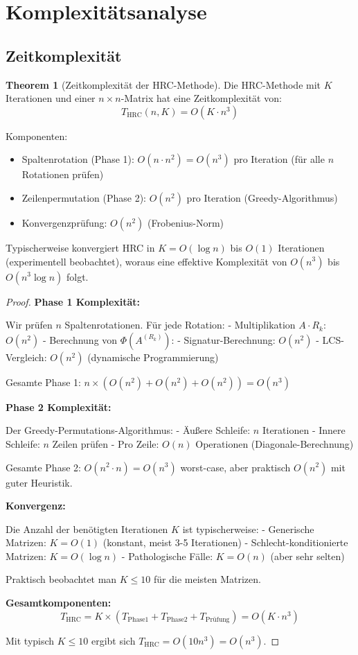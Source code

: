 \documentclass[a4paper,12pt]{article}
\theoremstyle{definition}
\newtheorem{theorem}{Theorem}
\begin{document}
\section{Komplexitätsanalyse}

\subsection{Zeitkomplexität}

\begin{theorem}[Zeitkomplexität der HRC-Methode]
Die HRC-Methode mit $K$ Iterationen und einer $n \times n$-Matrix hat eine Zeitkomplexität von:
\[
T_{\text{HRC}}(n, K) = O(K \cdot n^3)
\]

Komponenten:
\begin{itemize}
	\item Spaltenrotation (Phase 1): $O(n \cdot n^2) = O(n^3)$ pro Iteration (für alle $n$ Rotationen prüfen)
	\item Zeilenpermutation (Phase 2): $O(n^2)$ pro Iteration (Greedy-Algorithmus)
	\item Konvergenzprüfung: $O(n^2)$ (Frobenius-Norm)
\end{itemize}

Typischerweise konvergiert HRC in $K = O(\log n)$ bis $O(1)$ Iterationen (experimentell beobachtet), woraus eine effektive Komplexität von $O(n^3)$ bis $O(n^3 \log n)$ folgt.
\end{theorem}

\begin{proof}
\textbf{Phase 1 Komplexität:} 

Wir prüfen $n$ Spaltenrotationen. Für jede Rotation:
- Multiplikation $A \cdot R_k$: $O(n^2)$
- Berechnung von $\Phi(A^{(R_k)})$: 
  - Signatur-Berechnung: $O(n^2)$
  - LCS-Vergleich: $O(n^2)$ (dynamische Programmierung)

Gesamte Phase 1: $n \times (O(n^2) + O(n^2) + O(n^2)) = O(n^3)$

\textbf{Phase 2 Komplexität:}

Der Greedy-Permutations-Algorithmus:
- Äußere Schleife: $n$ Iterationen
- Innere Schleife: $n$ Zeilen prüfen
- Pro Zeile: $O(n)$ Operationen (Diagonale-Berechnung)

Gesamte Phase 2: $O(n^2 \cdot n) = O(n^3)$ worst-case, aber praktisch $O(n^2)$ mit guter Heuristik.

\textbf{Konvergenz:}

Die Anzahl der benötigten Iterationen $K$ ist typischerweise:
- Generische Matrizen: $K = O(1)$ (konstant, meist 3-5 Iterationen)
- Schlecht-konditionierte Matrizen: $K = O(\log n)$
- Pathologische Fälle: $K = O(n)$ (aber sehr selten)

Praktisch beobachtet man $K \leq 10$ für die meisten Matrizen.

\textbf{Gesamtkomponenten:}
\[
T_{\text{HRC}} = K \times (T_{\text{Phase1}} + T_{\text{Phase2}} + T_{\text{Prüfung}}) = O(K \cdot n^3)
\]

Mit typisch $K \leq 10$ ergibt sich $T_{\text{HRC}} = O(10 n^3) = O(n^3)$.
\end{proof}
\end{document}
